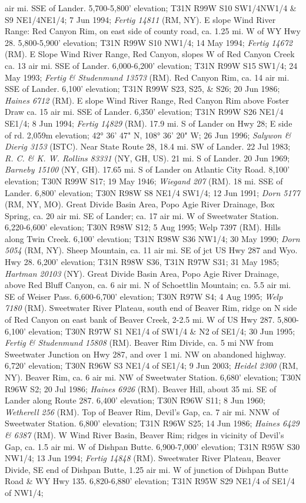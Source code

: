 air mi. SSE of Lander.  5,700-5,800' elevation; T31N R99W S10 SW1/4NW1/4 \& S9 NE1/4NE1/4; 7 Jun 1994; \textit{Fertig 14811} (RM, NY).  E slope Wind River Range: Red Canyon Rim, on east side of county road, ca. 1.25 mi. W of WY Hwy 28. 5,800-5,900' elevation; T31N R99W S10 NW1/4; 14 May 1994; \textit{Fertig 14672} (RM).  E Slope Wind River Range, Red Canyon,  slopes W of Red Canyon Creek ca. 13 air mi. SSE of Lander. 6,000-6,200' elevation; T31N R99W S15 SW1/4; 24 May 1993; \textit{Fertig \& Studenmund 13573} (RM).  Red Canyon Rim, ca. 14 air mi. SSE of Lander. 6,100' elevation; T31N R99W S23, S25, \& S26; 20 Jun 1986; \textit{Haines 6712} (RM).  E slope Wind River Range, Red Canyon Rim above Foster Draw ca. 15 air mi. SSE of Lander.  6,350' elevation; T31N R99W S26 NE1/4 SE1/4; 8 Jun 1994; \textit{Fertig 14829} (RM).  17.9 mi. S of Lander on Hwy 28; E side of rd. 2,059m elevation; 42° 36' 47" N, 108° 36' 20" W; 26 Jun 1996; \textit{Salywon \& Dierig 3153} (ISTC).  Near State Route 28, 18.4 mi. SW of Lander. 22 Jul 1983; \textit{R. C. \& K. W. Rollins 83331} (NY, GH, US).  21 mi. S of Lander. 20 Jun 1969; \textit{Barneby 15100} (NY, GH).  17.65 mi. S of Lander on Atlantic City Road. 8,100' elevation; T30N R99W S17; 19 May 1946; \textit{Wiegand 207} (RM).  18 mi. SSE of Lander. 6,800' elevation; T30N R98W S8 NE1/4 SW1/4; 12 Jun 1991; \textit{Dorn 5177} (RM, NY, MO).  Great Divide Basin Area, Popo Agie River Drainage, Box Spring, ca. 20 air mi. SE of Lander; ca. 17 air mi. W of Sweetwater Station. 6,220-6,600' elevation; T30N R98W S12; 5 Aug 1995; Welp 7397 (RM).  Hills along Twin Creek. 6,100' elevation; T31N R98W S36 NW1/4; 30 May 1990; \textit{Dorn 5054} (RM, NY).  Sheep Mountain, ca. 11 air mi. SE of jct US Hwy 287 and Wyo. Hwy 28. 6,200' elevation; T31N R98W S36, T31N R97W S31; 31 May 1985; \textit{Hartman 20103} (NY).  Great Divide Basin Area, Popo Agie River Drainage, above Red Bluff Canyon, ca. 6 air mi. N of Schoettlin Mountain; ca. 5.5 air mi. SE of Weiser Pass. 6,600-6,700' elevation; T30N R97W S4; 4 Aug 1995; \textit{Welp 7180} (RM).  Sweetwater River Plateau, south end of Beaver Rim, ridge on N side of Red Canyon on east bank of Beaver Creek, 2-2.5 mi. W of US Hwy 287. 5,800-6,100' elevation; T30N R97W S1 NE1/4 of SW1/4 \& N2 of SE1/4; 30 Jun 1995; \textit{Fertig \& Studenmund 15808} (RM).  Beaver Rim Divide, ca. 5 mi NW from Sweetwater Junction on Hwy 287, and over 1 mi. NW on abandoned highway. 6,720' elevation; T30N R96W S3 NE1/4 of SE1/4; 9 Jun 2003; \textit{Heidel 2300} (RM, NY).  Beaver Rim, ca. 6 air mi. NW of Sweetwater Station. 6,680' elevation; T30N R96W S2; 20 Jul 1986; \textit{Haines 6926} (RM).  Beaver Hill, about 35 mi. SE of Lander along Route 287. 6,400' elevation; T30N R96W S11; 8 Jun 1960; \textit{Wetherell 256} (RM).  Top of Beaver Rim, Devil's Gap, ca. 7 air mi. NNW of Sweetwater Station. 6,800' elevation; T31N R96W S25; 14 Jun 1986; \textit{Haines 6429 \& 6387} (RM).  W Wind River Basin, Beaver Rim; ridges in vicinity of Devil's Gap, ca. 1.5 air mi. W of Dishpan Butte. 6,900-7,000' elevation; T31N R95W S30 NW1/4; 13 Jun 1994; \textit{Fertig 14848} (RM).  Sweetwater River Plateau, Beaver Divide, SE end of Dishpan Butte, 1.25 air mi. W of junction of Dishpan Butte Road \& WY Hwy 135. 6,820-6,880' elevation; T31N R95W S29 NE1/4 of SE1/4 of NW1/4; 